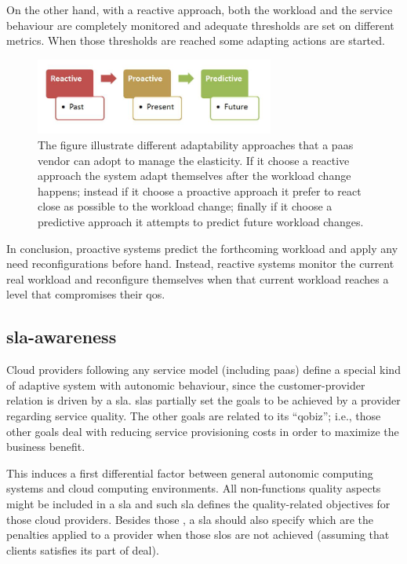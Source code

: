 On the other hand, with a reactive approach, both the workload and the service behaviour are completely
monitored and adequate thresholds are set on different metrics. When those thresholds are reached some
adapting actions are started.

\begin{figure}
	\centering{}
	\includegraphics[width=0.7\textwidth]{chapters/elasticity/images/adaptability.png}
	\caption[Different adaptability approaches]{The figure illustrate different adaptability approaches
		that a \ac{paas} vendor can adopt to manage the elasticity. If it choose a reactive approach the
		system adapt themselves after the workload change happens; instead if it choose a proactive approach
		it prefer to react close as possible to the workload change; finally if it choose a predictive
		approach it attempts to predict future workload changes.}
	\label{img:elasticity-requirements-adaptability}
\end{figure}

In conclusion, proactive systems predict the forthcoming workload and apply any need reconfigurations
before hand. Instead, reactive systems monitor the current real workload and reconfigure themselves
when that current workload reaches a level that compromises their \ac{qos}.

\subsection{\acs{sla}-awareness}
\label{sec:elasticity-requirements-slaAwareness}
Cloud providers following any service model (including \ac{paas}) define a special kind of adaptive
system with autonomic behaviour, since the customer-provider relation is driven by a \ac{sla}.
\ac{sla}s partially set the goals to be achieved by a provider regarding service quality. The other
goals are related to its ``\ac{qobiz}''; i.e., those other goals deal with reducing service provisioning
costs in order to maximize the business benefit.

This induces a first differential factor between general autonomic computing systems and cloud computing
environments. All non-functions quality aspects might be included in a \ac{sla} and such \ac{sla} 
defines the quality-related objectives for those cloud providers. Besides those , a \ac{sla}
should also specify which are the penalties applied to a provider when those \ac{slo}s are not achieved
(assuming that clients satisfies its part of deal).

